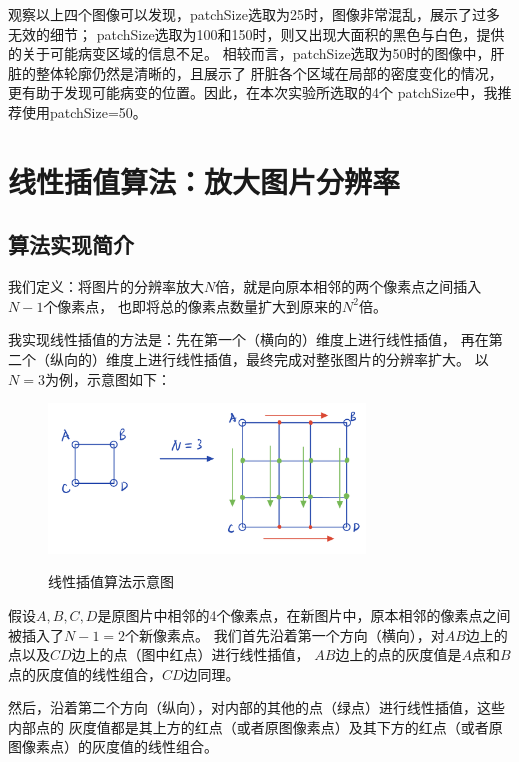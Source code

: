 \documentclass{article}
\begin{document}
观察以上四个图像可以发现，patchSize选取为25时，图像非常混乱，展示了过多无效的细节；
patchSize选取为100和150时，则又出现大面积的黑色与白色，提供的关于可能病变区域的信息不足。
相较而言，patchSize选取为50时的图像中，肝脏的整体轮廓仍然是清晰的，且展示了
肝脏各个区域在局部的密度变化的情况，更有助于发现可能病变的位置。因此，在本次实验所选取的4个
patchSize中，我推荐使用patchSize=50。



\section{线性插值算法：放大图片分辨率}

\subsection{算法实现简介}
我们定义：将图片的分辨率放大$N$倍，就是向原本相邻的两个像素点之间插入$N-1$个像素点，
也即将总的像素点数量扩大到原来的$N^2$倍。

我实现线性插值的方法是：先在第一个（横向的）维度上进行线性插值，
再在第二个（纵向的）维度上进行线性插值，最终完成对整张图片的分辨率扩大。
以$N=3$为例，示意图如下：

\begin{figure}[H]
	\centering
	{\includegraphics[width=0.75\textwidth]{算法示意图.jpg}} 
	\caption{线性插值算法示意图}
\end{figure}

假设$A, B, C, D$是原图片中相邻的4个像素点，在新图片中，原本相邻的像素点之间
被插入了$N-1=2$个新像素点。
我们首先沿着第一个方向（横向），对$AB$边上的点以及$CD$边上的点（图中红点）进行线性插值，
$AB$边上的点的灰度值是$A$点和$B$点的灰度值的线性组合，$CD$边同理。

然后，沿着第二个方向（纵向），对内部的其他的点（绿点）进行线性插值，这些内部点的
灰度值都是其上方的红点（或者原图像素点）及其下方的红点（或者原图像素点）的灰度值的线性组合。
\end{document}
